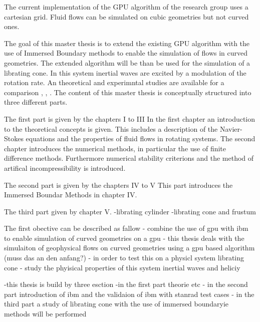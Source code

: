 \clearpage

The current implementation of the GPU algorithm of the research group uses a cartesian grid.
Fluid flows can be simulated on cubic geometries but not curved ones.

The goal of this master thesis is to extend the existing GPU algorithm with the use of Immersed Boundary methods
to enable the simulation of flows in curved  geometries.
The extended algorithm will be than be used for the simulation of a librating cone.
In this system inertial waves are excited by a modulation of the rotation rate.
An theoretical and experimntal studies are available for a comparison \citep{1}, \citep{1}, \citep{1}.
The content of this  master thesis is conceptually structured into three different parts.

The first part is given by the  chapters \RN{1} to \RN{3}
In the first chapter an introduction to the theoretical concepts is given.
This includes a description of the Navier-Stokes equations and the properties of fluid flows in rotating systems.
The second chapter introduces the numerical methods, in particular the use of finite difference methods.
Furthermore numerical stability criterions and the method of artifical incompressibility is introduced.

The second part is given by the chapters \RN{4} to \RN{5}
This part introduces the Immersed Boundar Methods in chapter \RN{4}.

The third part given by chapter \RN{5}.
-librating cylinder
-librating cone and frustum

The first obective can  be described as fallow
- combine the use of gpu with ibm to enable simulation of curved geometries on a gpu
-  this thesis deals with the simulaiton of geophysical flows on  curved geometries using a gpu based algorithm (muss das an den anfang?)
- in order to test this on a physicl system  librating cone
- study the phyisical properties of this system inertial waves  and heliciy

-this thesis is build by three esction
-in the first part theorie etc
- in the second part introduction of ibm and the validaion of ibm with stanrad test cases
- in the third part a study of  librating cone with the use of immersed boundaryie methods will be performed













